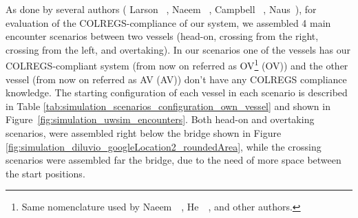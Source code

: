     As done by several authors (\eg{} Larson \etal{}~\cite{Larson2006Autonomous}, Naeem \etal{}~\cite{Naeem2012COLREGS}, Campbell \etal{}~\cite{Campbell2013Automatic}, Naus~\cite{Naus2013Idea}), for evaluation of the \ac{COLREGS}-compliance of our system, we assembled 4 main encounter scenarios between two vessels (head-on, crossing from the right, crossing from the left, and overtaking). In our scenarios one of the vessels has our \ac{COLREGS}-compliant system (from now on referred as \acl{OV}\footnote{Same nomenclature used by Naeem~\etal{}~\cite{Naeem2011Evasive}, He~\etal{}~\cite{He2017}, and other authors.} (\ac{OV})) and the other vessel (from now on referred as \acl{AV} (\ac{AV})) don't have any \ac{COLREGS} compliance knowledge. The starting configuration of each vessel in each scenario is described in Table \ref{tab:simulation_scenarios_configuration_own_vessel} and shown in Figure~\ref{fig:simulation_uwsim_encounters}. Both head-on and overtaking scenarios, were assembled right below the bridge shown in Figure \ref{fig:simulation_diluvio_googleLocation2_roundedArea}, while the crossing scenarios were assembled far the bridge, due to the need of more space between the start positions.



